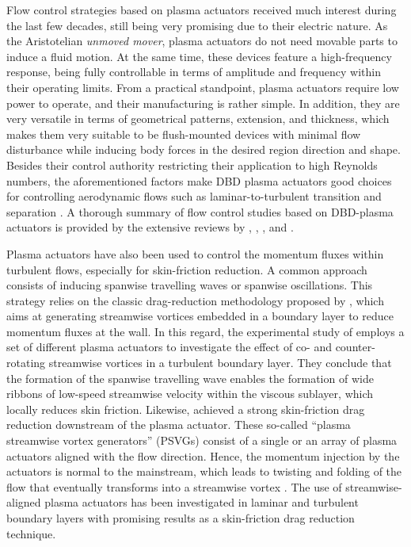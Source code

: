 Flow control strategies based on plasma actuators received much interest during the last few decades, still being very promising due to their electric nature. As the Aristotelian \textit{unmoved mover}, plasma actuators do not need movable parts to induce a fluid motion. At the same time, these devices feature a high-frequency response, being fully controllable in terms of amplitude and frequency within their operating limits. From a practical standpoint, plasma actuators require low power to operate, and their manufacturing is rather simple. In addition, they are very versatile in terms of geometrical patterns, extension, and thickness, which makes them very suitable to be flush-mounted devices with minimal flow disturbance while inducing body forces in the desired region direction and shape. Besides their control authority restricting their application to high Reynolds numbers, the aforementioned factors make DBD plasma actuators good choices for controlling aerodynamic flows such as laminar-to-turbulent transition \citep{Grundmann2008cancelTS,kotsonis2015control} and separation \citep{Little2010airfoilplasma,Michelis2015track}. A thorough summary of flow control studies based on DBD-plasma actuators is provided by the extensive reviews by \citet{Moreau2007review}, \citet{Corke2010}, \citet{Benard2014review}, and \citet{Kotsonis2015review}.

Plasma actuators have also been used to control the momentum fluxes within turbulent flows, especially for skin-friction reduction. A common approach consists of inducing spanwise travelling waves or spanwise oscillations. This strategy relies on the classic drag-reduction methodology proposed by \citet{Schoppa1998}, which aims at generating streamwise vortices embedded in a boundary layer to reduce momentum fluxes at the wall. In this regard, the experimental study of \citet{Whalley2014} employs a set of different plasma actuators to investigate the effect of co- and counter-rotating streamwise vortices in a turbulent boundary layer. They conclude that the formation of the spanwise travelling wave enables the formation of wide ribbons of low-speed streamwise velocity within the viscous sublayer, which locally reduces skin friction. Likewise, \citet{jukes2006TBLcontrol} achieved a strong skin-friction drag reduction downstream of the plasma actuator. These so-called ``plasma streamwise vortex generators'' (PSVGs) consist of a single or an array of plasma actuators aligned with the flow direction. Hence, the momentum injection by the actuators is normal to the mainstream, which leads to twisting and folding of the flow that eventually transforms into a streamwise vortex \citep{jukes2013plasmaVG}. The use of streamwise-aligned plasma actuators has been investigated in laminar \citep[e.g.,][]{jukes2013plasmaVG,serpieri2017} and turbulent boundary layers \citep[e.g.,][]{Jukes2006, Whalley2010DBDvortex, Wittig2019VGplasma} with promising results as a skin-friction drag reduction technique. 

